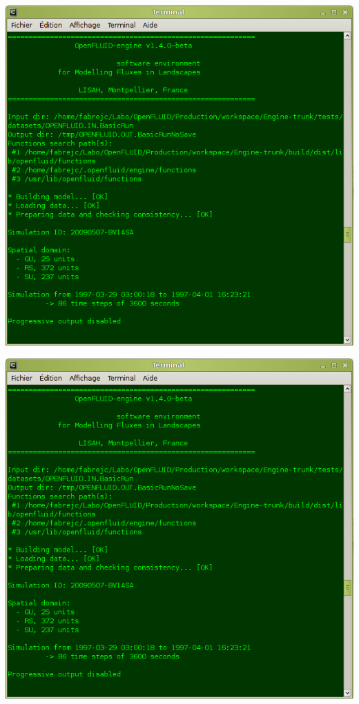 \bigskip

\begin{latexonly}
\begin{center}
\includegraphics[scale=0.6]{common/graphics/oferun.png}
\end{center}
\end{latexonly}

\begin{htmlonly}
\begin{center}
\includegraphics[scale=1]{common/graphics/oferun.png}
\end{center}
\end{htmlonly}

